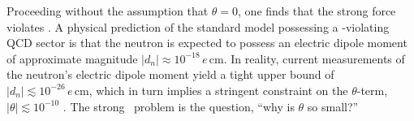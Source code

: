 Proceeding without the assumption that $θ = 0$, one finds that the strong force violates \CP.
A physical prediction of the standard model possessing a \CP-violating QCD sector is that the neutron is expected to possess an electric dipole moment of approximate magnitude $|d_n| \approx 10^{-18} \,e\,\mathrm{cm}$.
In reality, current measurements \cite{electric_dipole_neutron_2020} of the neutron's electric dipole moment yield a tight upper bound of $|d_n| \lesssim 10^{-26} \,e\,\mathrm{cm}$, which in turn implies a stringent constraint on the $θ$-term, $|θ| \lesssim 10^{-10}$ \cite{Review_2018}.
The strong \CP\ problem is the question, ``why is $θ$ so small?''

